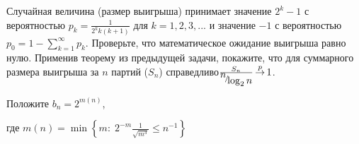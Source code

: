 \begin{problem}

Случайная величина (размер выигрыша) принимает значение $2^{k} -1$ с вероятностью $p_{k} =\frac{1}{2^{k} k(k+1)} $ для $k=1,2,3,...$ и значение\textit{ $-1$} с вероятностью $p_{0} =1-\sum _{k=1}^{\infty }p_{k}  $. Проверьте, что математическое ожидание выигрыша равно нулю. Применив теорему из предыдущей задачи, покажите, что для суммарного размера выигрыша за $n$ партий ($S_{n} $) справедливо$\frac{S_{n} }{{\raise0.7ex\hbox{$ n $}\!\mathord{\left/ {\vphantom {n \log _{2} n}} \right. \kern-\nulldelimiterspace}\!\lower0.7ex\hbox{$ \log _{2} n $}} } \mathop{\to }\limits^{p} 1$.

\begin{ordre}  
Положите $b_{n} =2^{m(n)} $,

 где $m(n)=\min \left\{m:\; 2^{-m} \frac{1}{\sqrt{m^{3}}} \le n^{-1} \right\}$
\end{ordre} 

\end{problem}

